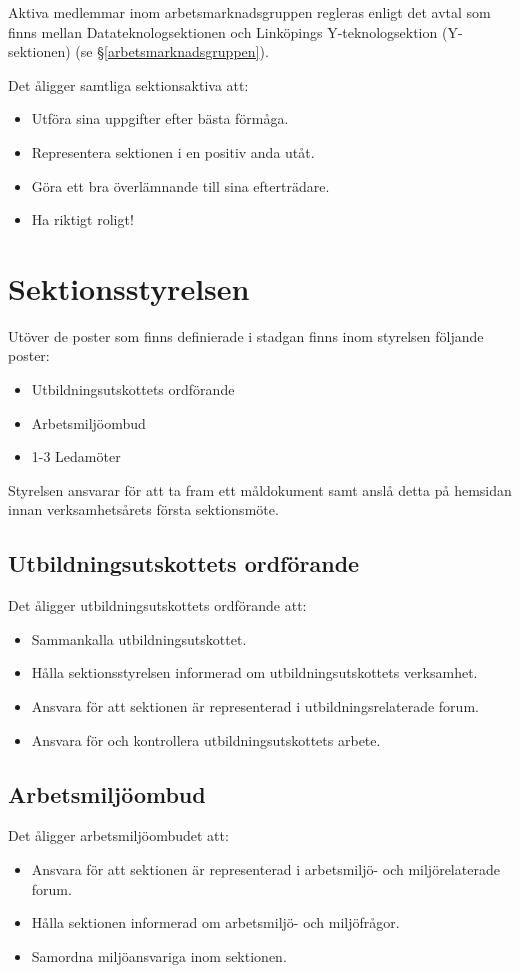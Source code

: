 \documentclass{datateknologsektionen-document}
\begin{document}
Aktiva medlemmar inom arbetsmarknadsgruppen regleras enligt det avtal som finns
mellan Datateknologsektionen och Linköpings Y-teknologsektion (Y-sektionen) (se \S \ref{arbetsmarknadsgruppen}).

Det åligger samtliga sektionsaktiva att:
\begin{itemize}
  \item Utföra sina uppgifter efter bästa förmåga.
  \item Representera sektionen i en positiv anda utåt.
  \item Göra ett bra överlämnande till sina efterträdare.
  \item Ha riktigt roligt!
\end{itemize}

\section{Sektionsstyrelsen}
Utöver de poster som finns definierade i stadgan finns inom styrelsen följande poster:
\begin{itemize}
  \item Utbildningsutskottets ordförande
  \item Arbetsmiljöombud
  \item 1-3 Ledamöter
\end{itemize}

Styrelsen ansvarar för att ta fram ett måldokument samt anslå detta på hemsidan
innan verksamhetsårets första sektionsmöte.

\subsection{Utbildningsutskottets ordförande}
\label{utbuordf}
Det åligger utbildningsutskottets ordförande att:
\begin{itemize}
  \item Sammankalla utbildningsutskottet.
  \item Hålla sektionsstyrelsen informerad om utbildningsutskottets verksamhet.
  \item Ansvara för att sektionen är representerad i utbildningsrelaterade forum.
  \item Ansvara för och kontrollera utbildningsutskottets arbete.
\end{itemize}

\subsection{Arbetsmiljöombud}
\label{amo}
Det åligger arbetsmiljöombudet att:
\begin{itemize}
  \item Ansvara för att sektionen är representerad i arbetsmiljö- och miljörelaterade forum.
  \item Hålla sektionen informerad om arbetsmiljö- och miljöfrågor.
  \item Samordna miljöansvariga inom sektionen.
\end{itemize}
\end{document}
